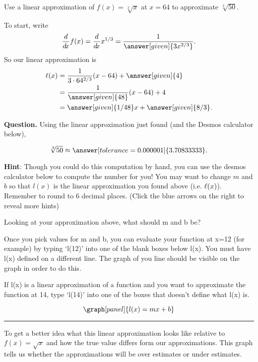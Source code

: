 \documentclass[handout,nooutcomes]{ximera}
\begin{document}
\begin{example}
Use a linear approximation of $f(x) =\sqrt[3]{x}$ at $x=64$ to
approximate $\sqrt[3]{50}$.\\

\begin{explanation}
To start, write
\[
\ddx f(x) = \ddx x^{1/3} = \frac{1}{\answer[given]{3x^{2/3}}}.
\]
So our linear approximation is
\begin{align*}
\l(x) &= \frac{1}{3\cdot 64^{2/3}} (x-64) + \answer[given]{4} \\
&= \frac{1}{\answer[given]{48}} (x-64) + 4\\
&= \answer[given]{1/48}x + \answer[given]{8/3}.
\end{align*}



\textbf{Question. } Using the linear approximation just found (and
the Desmos calculator below),

\[
\sqrt[3]{50} \approx \answer[tolerance=0.000001]{3.70833333}.
\]

\bigskip

\textbf{Hint}: Though you could do this computation by hand, you can use
the desmos calculator below to compute the number for you! You may want
to change $m$ and $b$ so that $l(x)$ is the linear approximation you
found above (i.e. $\ell(x)$). Remember to round to 6 decimal places.
(Click the blue arrows on the right to reveal more hints)

\begin{expandable}
Looking at your approximation above, what should m and b be?
\end{expandable}
\begin{expandable}
Once you pick values for m and b, you can evaluate your function
at x=12 (for example) by typing `l(12)' into one of the blank boxes below l(x).
You must have l(x) defined on a different line. The graph of you line
should be visible on the graph in order to do this.
\end{expandable}
\begin{expandable}
If l(x) is a linear approximation of a function and you want to approximate
the function at 14, type `l(14)' into one of the boxes that doesn't define what l(x) is.
\end{expandable}

\[
\graph[panel]{l(x)=mx+b}
\]
\hrule

\medskip

To get a better idea what this linear approximation looks like relative to
$f(x)=\sqrt{x}$ and how the true value differs form our approximations.
This graph tells us whether the approximations will be over estimates or
under estimates.\\




\end{explanation}
\end{example}
\end{document}
